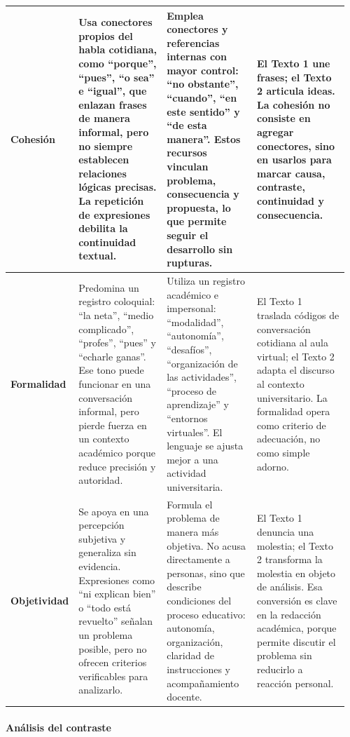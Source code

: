 \begin{landscape}
\begin{longtable}{@{}p{0.14\linewidth}p{0.27\linewidth}p{0.27\linewidth}p{0.28\linewidth}@{}}
\textbf{Cohesión} &
Usa conectores propios del habla cotidiana, como ``porque'', ``pues'', ``o sea'' e ``igual'', que enlazan frases de manera informal, pero no siempre establecen relaciones lógicas precisas. La repetición de expresiones debilita la continuidad textual. &
Emplea conectores y referencias internas con mayor control: ``no obstante'', ``cuando'', ``en este sentido'' y ``de esta manera''. Estos recursos vinculan problema, consecuencia y propuesta, lo que permite seguir el desarrollo sin rupturas. &
El Texto 1 une frases; el Texto 2 articula ideas. La cohesión no consiste en agregar conectores, sino en usarlos para marcar causa, contraste, continuidad y consecuencia. \\
\midrule

\textbf{Formalidad} &
Predomina un registro coloquial: ``la neta'', ``medio complicado'', ``profes'', ``pues'' y ``echarle ganas''. Ese tono puede funcionar en una conversación informal, pero pierde fuerza en un contexto académico porque reduce precisión y autoridad. &
Utiliza un registro académico e impersonal: ``modalidad'', ``autonomía'', ``desafíos'', ``organización de las actividades'', ``proceso de aprendizaje'' y ``entornos virtuales''. El lenguaje se ajusta mejor a una actividad universitaria. &
El Texto 1 traslada códigos de conversación cotidiana al aula virtual; el Texto 2 adapta el discurso al contexto universitario. La formalidad opera como criterio de adecuación, no como simple adorno. \\
\midrule

\textbf{Objetividad} &
Se apoya en una percepción subjetiva y generaliza sin evidencia. Expresiones como ``ni explican bien'' o ``todo está revuelto'' señalan un problema posible, pero no ofrecen criterios verificables para analizarlo. &
Formula el problema de manera más objetiva. No acusa directamente a personas, sino que describe condiciones del proceso educativo: autonomía, organización, claridad de instrucciones y acompañamiento docente. &
El Texto 1 denuncia una molestia; el Texto 2 transforma la molestia en objeto de análisis. Esa conversión es clave en la redacción académica, porque permite discutir el problema sin reducirlo a reacción personal. \\
\end{longtable}
\endgroup
\end{landscape}

\pagestyle{fancy}

\paragraph{Análisis del contraste}

